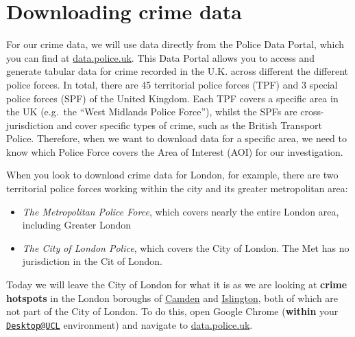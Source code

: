 \documentclass[
]{book}
\providecommand{\tightlist}{%
  \setlength{\itemsep}{0pt}\setlength{\parskip}{0pt}}
\begin{document}
\hypertarget{downloading-crime-data}{%
\section*{Downloading crime data}\label{downloading-crime-data}}

For our crime data, we will use data directly from the Police Data Portal, which you can find at \href{https://data.police.uk/}{data.police.uk}. This Data Portal allows you to access and generate tabular data for crime recorded in the U.K. across different the different police forces. In total, there are 45 territorial police forces (TPF) and 3 special police forces (SPF) of the United Kingdom. Each TPF covers a specific area in the UK (e.g.~the ``West Midlands Police Force''), whilst the SPFs are cross-jurisdiction and cover specific types of crime, such as the British Transport Police. Therefore, when we want to download data for a specific area, we need to know which Police Force covers the Area of Interest (AOI) for our investigation.

When you look to download crime data for London, for example, there are two territorial police forces working within the city and its greater metropolitan area:

\begin{itemize}
\tightlist
\item
  \emph{The Metropolitan Police Force}, which covers nearly the entire London area, including Greater London
\item
  \emph{The City of London Police}, which covers the City of London. The Met has no jurisdiction in the Cit of London.
\end{itemize}

Today we will leave the City of London for what it is as we are looking at \textbf{crime hotspots} in the London boroughs of \href{https://www.google.com/maps/place/London+Borough+of+Camden,+London/@51.5428102,-0.1944449,13z/data=!3m1!4b1!4m5!3m4!1s0x48761aec186b9a3d:0x41185c626be66e0!8m2!3d51.5454736!4d-0.1627902?hl=en}{Camden} and \href{https://www.google.com/maps/place/London+Borough+of+Islington,+London/@51.5470193,-0.1444663,13z/data=!3m1!4b1!4m5!3m4!1s0x48761b5dedeb3be5:0x54f085cb18ec65c9!8m2!3d51.5465063!4d-0.1058058?hl=en}{Islington}, both of which are not part of the City of London. To do this, open Google Chrome (\textbf{within} your \href{mailto:Desktop@UCL}{\nolinkurl{Desktop@UCL}} environment) and navigate to \href{https://data.police.uk/}{data.police.uk}.
\end{document}
